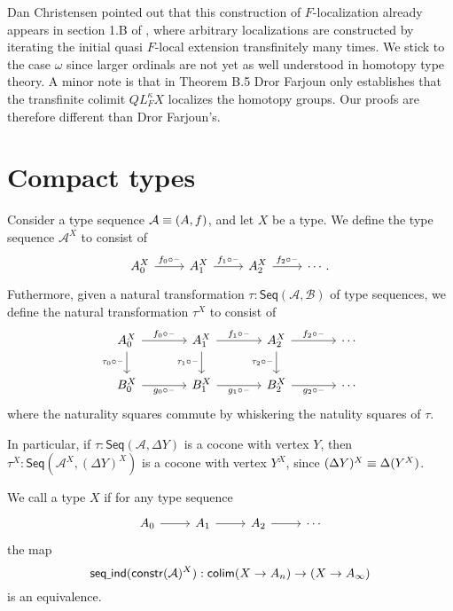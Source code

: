 Dan Christensen pointed out that this construction of $F$-localization already appears in section 1.B of \cite{DrorFarjoun}, where arbitrary localizations are constructed by iterating the initial quasi $F$-local extension transfinitely many times. We stick to the case $\omega$ since larger ordinals are not yet as well understood in homotopy type theory. A minor note is that in Theorem B.5 Dror Farjoun only establishes that the transfinite colimit $QL_F^\kappa X$ localizes the homotopy groups. Our proofs are therefore different than Dror Farjoun's.

\section{Compact types}

\begin{defn}
Consider a type sequence $\mathcal{A}\equiv (A,f)$, and let $X$ be a type. We define the type sequence $\mathcal{A}^X$ to consist of
\begin{equation*}
\begin{tikzcd}
A_0^X \arrow[r,"f_0\circ \blank"] & A_1^X \arrow[r,"f_1\circ\blank"] & A_2^X \arrow[r,"f_2\circ\blank"] & \cdots. 
\end{tikzcd}
\end{equation*}
Futhermore, given a natural transformation $\tau:\mathsf{Seq}(\mathcal{A},\mathcal{B})$ of type sequences, we define the natural transformation $\tau^X$ to consist of
\begin{equation*}
\begin{tikzcd}[column sep=large]
A_0^X \arrow[r,"f_0\circ \blank"] \arrow[d,swap,"\tau_0\circ\blank"] & A_1^X \arrow[r,"f_1\circ\blank"] \arrow[d,swap,"\tau_1\circ\blank"] & A_2^X \arrow[r,"f_2\circ\blank"] \arrow[d,swap,"\tau_2\circ\blank"] & \cdots \\
B_0^X \arrow[r,swap,"g_0\circ \blank"] & B_1^X \arrow[r,swap,"g_1\circ\blank"] & B_2^X \arrow[r,swap,"g_2\circ\blank"] & \cdots
\end{tikzcd}
\end{equation*}
where the naturality squares commute by whiskering the natulity squares of $\tau$. 
\end{defn}

In particular, if $\tau:\mathsf{Seq}(\mathcal{A},\Delta Y)$ is a cocone with vertex $Y$, then $\tau^X :\mathsf{Seq}(\mathcal{A}^X,(\Delta Y)^X)$ is a cocone with vertex $Y^X$, since $(\Delta Y)^X \equiv \Delta (Y^X)$.  

\begin{defn}
We call a type $X$  if for any type sequence
\begin{equation*}
\begin{tikzcd}
A_0 \arrow[r] & A_1 \arrow[r] & A_2 \arrow[r] & \cdots
\end{tikzcd}
\end{equation*}
the map
\begin{equation*}
\mathsf{seq\underline{\ }{}ind}(\mathsf{constr}(\mathcal{A})^X)
  : \mathsf{colim}(X\to A_n)\to(X\to A_\infty)
\end{equation*}
is an equivalence.
\end{defn}

